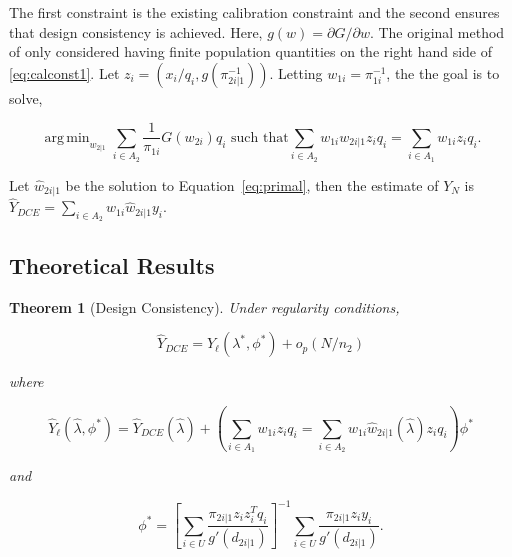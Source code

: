 \documentclass[12pt]{article}
\newtheorem{theorem}{Theorem}
\DeclareMathOperator*{\argmin}{arg\,min}
\begin{document}
The first constraint is the existing calibration constraint and the second
ensures that design consistency is achieved. Here, 
$g(w) = \partial G / \partial w$. 
The original method of \cite{kwon2024debiased} only considered having finite
population quantities on the right hand side of \ref{eq:calconst1}.
Let $z_i = (x_i / q_i, g(\pi_{2i|1}^{-1}))$. Letting $w_{1i} = \pi_{1i}^{-1}$,
the the goal is to solve,

\begin{equation}\label{eq:primal}
  \argmin_{w_{2|1}} \sum_{i \in A_2} \frac{1}{\pi_{1i}} G(w_{2i}) q_i 
  \text{ such that}
  \sum_{i \in A_2} w_{1i} w_{2i|1} z_i q_i = \sum_{i \in A_1} w_{1i} z_i q_i.
\end{equation}

Let $\hat w_{2i|1}$ be the solution to Equation~\ref{eq:primal}, then the
estimate of $Y_N$ is $\hat Y_{DCE} = \sum_{i \in A_2} w_{1i} \hat w_{2i|1} y_i$.


\subsection{Theoretical Results}

\begin{theorem}[Design Consistency]
  Under regularity conditions,

  $$\hat Y_{DCE} = \hat Y_\ell(\lambda^*, \phi^*) + o_p(N / n_2)$$

  where

  $$\hat Y_{\ell}(\hat \lambda, \phi^*) = \hat Y_{DCE}(\hat \lambda) + 
  \left(\sum_{i \in A_1} w_{1i} z_i q_i = \sum_{i \in A_2} w_{1i} \hat w_{2i|1}(\hat
  \lambda) z_i q_i\right)\phi^*$$

  and

  $$\phi^* = 
  \left[\sum_{i \in U} \frac{\pi_{2i|1}z_i z_i^T q_i}{g'(d_{2i|1})}\right]^{-1}
  \sum_{i \in U} \frac{\pi_{2i|1}z_i y_i}{g'(d_{2i|1})}.$$

\end{theorem}
\end{document}
